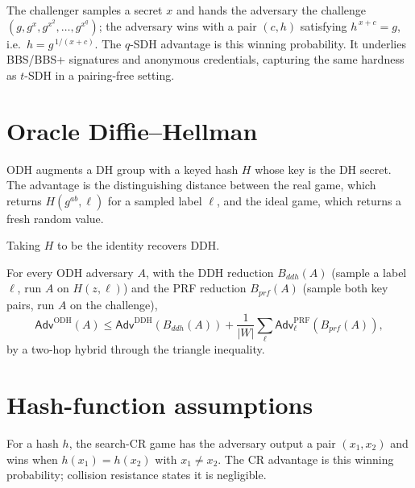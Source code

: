 \begin{definition}
  \label{def:qsdh}
  \leanok
  The challenger samples a secret $x$ and hands the adversary the challenge
  $(g, g^x, g^{x^2}, \dots, g^{x^q})$; the adversary wins with a pair $(c, h)$
  satisfying $h^{\,x + c} = g$, i.e.\ $h = g^{\,1/(x+c)}$. The $q$-SDH advantage
  is this winning probability. It underlies BBS/BBS+ signatures and anonymous
  credentials, capturing the same hardness as $t$-SDH in a pairing-free setting.
\end{definition}

\section{Oracle Diffie--Hellman}

\begin{definition}
  \label{def:odh}
  \leanok
  ODH augments a DH group with a keyed hash $H$ whose key is the DH secret. The
  advantage is the distinguishing distance between the real game, which returns
  $H(g^{ab}, \ell)$ for a sampled label $\ell$, and the ideal game, which returns
  a fresh random value.
\end{definition}

Taking $H$ to be the identity recovers DDH.

\begin{lemma}
  \label{def:odh-reduction}
  \leanok
  For every ODH adversary $A$, with the DDH reduction $B_{ddh}(A)$ (sample a label
  $\ell$, run $A$ on $H(z, \ell)$) and the PRF reduction $B_{prf}(A)$ (sample both
  key pairs, run $A$ on the challenge),
  \[
    \mathsf{Adv}^{\mathrm{ODH}}(A) \le \mathsf{Adv}^{\mathrm{DDH}}(B_{ddh}(A))
      + \frac{1}{|W|}\sum_{\ell} \mathsf{Adv}^{\mathrm{PRF}}_{\ell}(B_{prf}(A)),
  \]
  by a two-hop hybrid through the triangle inequality.
\end{lemma}

\section{Hash-function assumptions}

\begin{definition}
  \label{def:cr-search}
  \leanok
  For a hash $h$, the search-CR game has the adversary output a pair
  $(x_1, x_2)$ and wins when $h(x_1) = h(x_2)$ with $x_1 \neq x_2$. The CR
  advantage is this winning probability; collision resistance states it is
  negligible.
\end{definition}

